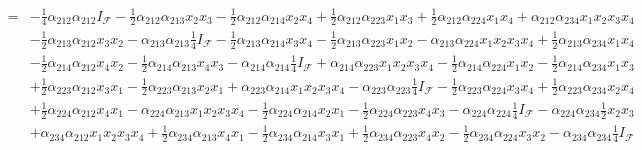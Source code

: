 \documentclass[aps, preprint]{revtex4}
\begin{document}
\begin{align} = &  -\frac{1}{4} \alpha _{2 1 2} \alpha _{2 1 2} I_{\mathcal{F}} -\frac{1}{2} \alpha _{2 1 2} \alpha _{2 1 3} x_{2} x_{3} -\frac{1}{2} \alpha _{2 1 2} \alpha _{2 1 4} x_{2} x_{4} +\frac{1}{2} \alpha _{2 1 2} \alpha _{2 2 3} x_{1} x_{3} +\frac{1}{2} \alpha _{2 1 2} \alpha _{2 2 4} x_{1} x_{4} +\alpha _{2 1 2} \alpha _{2 3 4} x_{1} x_{2} x_{3} x_{4} \nonumber  \\
 &  -\frac{1}{2} \alpha _{2 1 3} \alpha _{2 1 2} x_{3} x_{2} -\alpha _{2 1 3} \alpha _{2 1 3} \frac{1}{4} I_{\mathcal{F}} -\frac{1}{2} \alpha _{2 1 3} \alpha _{2 1 4} x_{3} x_{4} -\frac{1}{2} \alpha _{2 1 3} \alpha _{2 2 3} x_{1} x_{2} -\alpha _{2 1 3} \alpha _{2 2 4} x_{1} x_{2} x_{3} x_{4} +\frac{1}{2} \alpha _{2 1 3} \alpha _{2 3 4} x_{1} x_{4} \nonumber  \\
 &  -\frac{1}{2} \alpha _{2 1 4} \alpha _{2 1 2} x_{4} x_{2} -\frac{1}{2} \alpha _{2 1 4} \alpha _{2 1 3} x_{4} x_{3} -\alpha _{2 1 4} \alpha _{2 1 4} \frac{1}{4} I_{\mathcal{F}} +\alpha _{2 1 4} \alpha _{2 2 3} x_{1} x_{2} x_{3} x_{4} -\frac{1}{2} \alpha _{2 1 4} \alpha _{2 2 4} x_{1} x_{2} -\frac{1}{2} \alpha _{2 1 4} \alpha _{2 3 4} x_{1} x_{3} \nonumber  \\
 &  +\frac{1}{2} \alpha _{2 2 3} \alpha _{2 1 2} x_{3} x_{1} -\frac{1}{2} \alpha _{2 2 3} \alpha _{2 1 3} x_{2} x_{1} +\alpha _{2 2 3} \alpha _{2 1 4} x_{1} x_{2} x_{3} x_{4} -\alpha _{2 2 3} \alpha _{2 2 3} \frac{1}{4} I_{\mathcal{F}} -\frac{1}{2} \alpha _{2 2 3} \alpha _{2 2 4} x_{3} x_{4} +\frac{1}{2} \alpha _{2 2 3} \alpha _{2 3 4} x_{2} x_{4} \nonumber  \\
 &  +\frac{1}{2} \alpha _{2 2 4} \alpha _{2 1 2} x_{4} x_{1} -\alpha _{2 2 4} \alpha _{2 1 3} x_{1} x_{2} x_{3} x_{4} -\frac{1}{2} \alpha _{2 2 4} \alpha _{2 1 4} x_{2} x_{1} -\frac{1}{2} \alpha _{2 2 4} \alpha _{2 2 3} x_{4} x_{3} -\alpha _{2 2 4} \alpha _{2 2 4} \frac{1}{4} I_{\mathcal{F}} -\alpha _{2 2 4} \alpha _{2 3 4} \frac{1}{2} x_{2} x_{3} \nonumber  \\
 &  +\alpha _{2 3 4} \alpha _{2 1 2} x_{1} x_{2} x_{3} x_{4} +\frac{1}{2} \alpha _{2 3 4} \alpha _{2 1 3} x_{4} x_{1} -\frac{1}{2} \alpha _{2 3 4} \alpha _{2 1 4} x_{3} x_{1} +\frac{1}{2} \alpha _{2 3 4} \alpha _{2 2 3} x_{4} x_{2} -\frac{1}{2} \alpha _{2 3 4} \alpha _{2 2 4} x_{3} x_{2} -\alpha _{2 3 4} \alpha _{2 3 4} \frac{1}{4} I_{\mathcal{F}}\end{align}
\end{document}
